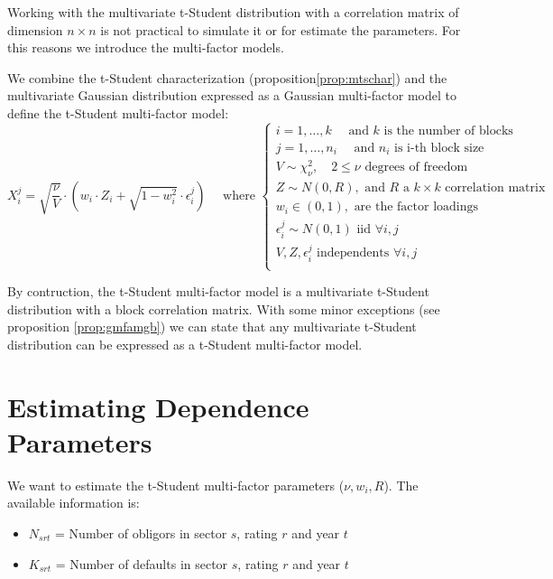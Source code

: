 \documentclass[11pt,fleqn]{book} %
\begin{document}
Working with the multivariate t-Student distribution with a correlation
matrix of dimension $n \times n$ is not practical to simulate it or for
estimate the parameters. For this reasons we introduce the multi-factor 
models.

\begin{definition}
	We combine the t-Student characterization (proposition\ref{prop:mtschar})
	and the multivariate Gaussian distribution expressed as a
	Gaussian multi-factor model to define the t-Student multi-factor
	model:
	\begin{displaymath}
		X_i^j = \sqrt{\frac{\nu}{V}} \cdot 
		\left( w_i \cdot Z_i + \sqrt{1-w_i^2} \cdot \epsilon_i^j \right)
		\quad \text{ where } \left\{
		\begin{array}{l}
			i = 1, \dots, k \quad \text{ and $k$ is the number of blocks}    \\
			j = 1, \dots, n_i \quad \text{ and $n_i$ is i-th block size}     \\
			V \sim \chi_{\nu}^2, \quad 2 \le \nu \text{ degrees of freedom}  \\
			Z \sim N(0,R), \text{ and $R$ a $k \times k$ correlation matrix} \\
			w_i \in (0,1), \text{ are the factor loadings }                  \\
			\epsilon_i^j \sim N(0,1) \text { iid } \forall i,j               \\
			V, Z, \epsilon_i^j \text{ independents } \forall i,j             \\
		\end{array}
		\right.
	\end{displaymath}
\end{definition}

By contruction, the t-Student multi-factor model is a multivariate
t-Student distribution with a block correlation matrix. With some
minor exceptions (see proposition \ref{prop:gmfamgb}) we can 
state that any multivariate t-Student distribution can be expressed
as a t-Student multi-factor model.

\chapter{Estimating Dependence Parameters}

We want to estimate the t-Student multi-factor parameters 
($\nu, w_i, R$). The available information is:
\begin{itemize}
	\item $N_{srt}$ = Number of obligors in sector $s$, rating $r$ and year $t$
	\item $K_{srt}$ = Number of defaults in sector $s$, rating $r$ and year $t$
\end{itemize}
\end{document}
